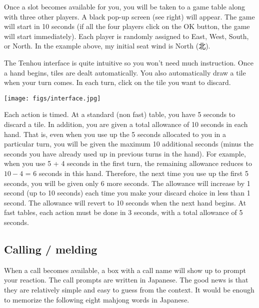 Once a slot becomes available for you, you will be taken to a game table along with three other players. A black pop-up screen (see right) will appear. The game will start in 10 seconds (if all the four players click on the OK button, the game will start immediately). Each player is randomly assigned to East, West, South, or North. In the example above, my initial seat wind is North (北). 

\bigskip
The {\jap Tenhou} interface is quite intuitive so you won't need much instruction. 
Once a hand begins, tiles are dealt automatically. You also automatically draw a tile when your turn comes. 
In each turn, click on the tile you want to discard. 

\begin{center}
\texttt{[image: figs/interface.jpg]}
\end{center}
\vspace{-20pt}

\bigskip
Each action is timed. At a standard (non fast) table, you have 5 seconds to discard a tile. In addition, you are given a total allowance of 10 seconds in each hand. That is, even when you use up the 5 seconds allocated to you in a particular turn, you will be given the maximum 10 additional seconds (minus the seconds you have already used up in previous turns in the hand). For example, when you use 5 + 4 seconds in the first turn, the remaining allowance reduces to $10 - 4$ = 6 seconds in this hand. Therefore, the next time you use up the first 5 seconds, you will be given only 6 more seconds. The allowance will increase by 1 second (up to 10 seconds) each time you make your discard choice in less than 1 second. The allowance will revert to 10 seconds when the next hand begins. At fast tables, each action must be done in 3 seconds, with a total allowance of 5 seconds.

\bigskip
\subsection{Calling / melding}
When a call becomes available, a box with a call name will show up to prompt your reaction. 
The call prompts are written in Japanese. The good news is that they are relatively simple and easy to guess from the context. It would be enough to memorize the following eight mahjong words in Japanese. 

